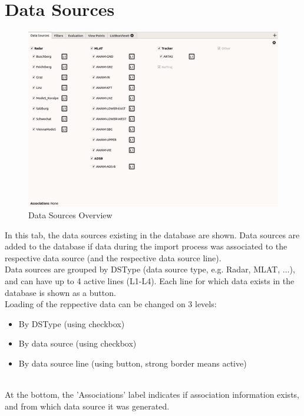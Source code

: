 \section{Data Sources}
\label{sec:ui_data_sources}

\begin{figure}[H]
    \hspace*{-2.5cm}
    \includegraphics[width=19cm,frame]{figures/ui_data_sources.png}
  \caption{Data Sources Overview}
\end{figure}

In this tab, the data sources existing in the database are shown. Data sources are added to the database if data during the import process was associated to the respective data source (and the respective data source line). \\

Data sources are grouped by DSType (data source type, e.g. Radar, MLAT, ...), and can have up to 4 active lines (L1-L4). Each line for which data exists in the database is shown as a button. \\

Loading of the reppective data can be changed on 3 levels:

\begin{itemize}
 \item By DSType (using checkbox)
 \item By data source (using checkbox)
 \item By data source line (using button, strong border means active)
\end{itemize}
\  \\

At the bottom, the 'Associations' label indicates if association information exists, and from which data source it was generated.\newline

